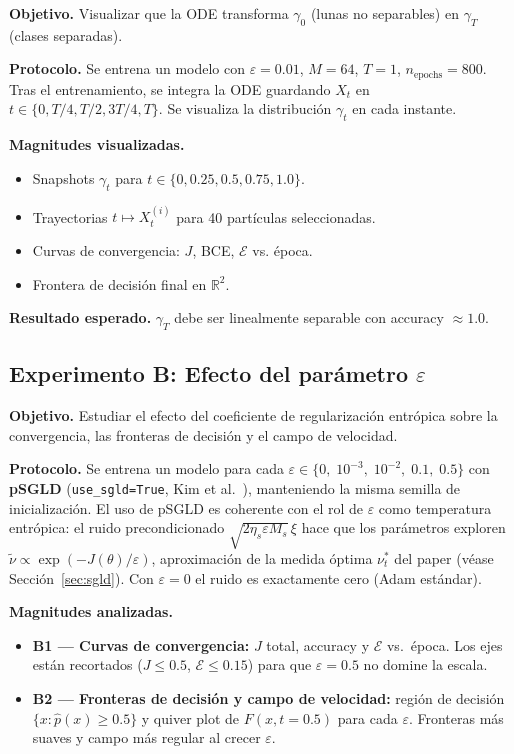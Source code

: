 \documentclass[11pt, a4paper]{article}
\theoremstyle{definition}
\newcommand{\R}{\mathbb{R}}
\begin{document}
\textbf{Objetivo.} Visualizar que la ODE transforma $\gamma_0$ (lunas no
separables) en $\gamma_T$ (clases separadas).

\textbf{Protocolo.} Se entrena un modelo con $\varepsilon = 0.01$, $M = 64$,
$T = 1$, $n_\text{epochs} = 800$. Tras el entrenamiento, se integra la ODE
guardando $X_t$ en $t \in \{0, T/4, T/2, 3T/4, T\}$. Se visualiza la
distribución $\gamma_t$ en cada instante.

\textbf{Magnitudes visualizadas.}
\begin{itemize}
  \item Snapshots $\gamma_t$ para $t \in \{0, 0.25, 0.5, 0.75, 1.0\}$.
  \item Trayectorias $t \mapsto X_t^{(i)}$ para 40 partículas seleccionadas.
  \item Curvas de convergencia: $J$, BCE, $\mathcal{E}$ vs. época.
  \item Frontera de decisión final en $\R^2$.
\end{itemize}

\textbf{Resultado esperado.} $\gamma_T$ debe ser linealmente separable con
accuracy $\approx 1.0$.

\subsection{Experimento B: Efecto del parámetro $\varepsilon$}

\textbf{Objetivo.} Estudiar el efecto del coeficiente de regularización
entrópica sobre la convergencia, las fronteras de decisión y el campo de
velocidad.

\textbf{Protocolo.} Se entrena un modelo para cada
$\varepsilon \in \{0,\; 10^{-3},\; 10^{-2},\; 0.1,\; 0.5\}$
con \textbf{pSGLD}
(\texttt{use\_sgld=True}, Kim et al.~\cite{li2016psgld}), manteniendo la
misma semilla de inicialización. El uso de pSGLD es coherente con el rol
de $\varepsilon$ como temperatura entrópica: el ruido precondicionado
$\sqrt{2\eta_s\varepsilon M_s}\,\xi$ hace que los parámetros exploren
$\tilde{\nu} \propto \exp(-J(\theta)/\varepsilon)$, aproximación de la medida
óptima $\nu^*_t$ del paper (véase Sección~\ref{sec:sgld}).
Con $\varepsilon = 0$ el ruido es exactamente cero (Adam estándar).

\textbf{Magnitudes analizadas.}
\begin{itemize}
  \item \textbf{B1 — Curvas de convergencia:} $J$ total, accuracy y
        $\mathcal{E}$ vs.\ época. Los ejes están recortados ($J \leq 0.5$,
        $\mathcal{E} \leq 0.15$) para que $\varepsilon=0.5$ no domine la escala.
  \item \textbf{B2 — Fronteras de decisión y campo de velocidad:} región de
        decisión $\{x : \hat{p}(x) \geq 0.5\}$ y quiver plot de $F(x, t=0.5)$
        para cada $\varepsilon$. Fronteras más suaves y campo más regular al
        crecer $\varepsilon$.
\end{itemize}
\end{document}
